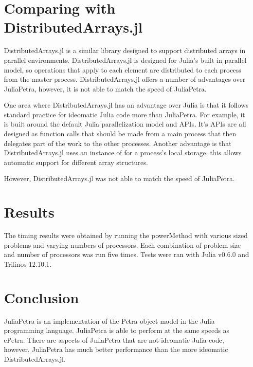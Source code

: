 \documentclass{article}
\newcommand{\juliaSnippet}[1]{\texttt{\detokenize{#1}}}
\begin{document}
\section{Comparing with DistributedArrays.jl}

DistributedArrays.jl is a similar library designed to support distributed arrays in parallel environments.
\cite{DAGithub}
DistributedArrays.jl is designed for Julia's built in parallel model, so operations that apply to
each element are distributed to each process from the master process.  DistributedArrays.jl offers a number of advantages over JuliaPetra, however, it is not able to
match the speed of JuliaPetra.

One area where DistributedArrays.jl has an advantage over Julia is that it follows standard
practice for ideomatic Julia code more than JuliaPetra.
For example, it is built around the default Julia parallelization model and APIs.
It's APIs are all designed as function calls that should be made from a main process that
then delegates part of the work to the other processes. %
Another advantage is that DistributedArrays.jl uses an instance of \juliaSnippet{AbstractArray}
for a process's local storage, this allows automatic support for different array structures.

However, DistributedArrays.jl was not able to match the speed of JuliaPetra.

\section{Results}


The timing results were obtained by running the powerMethod with various sized problems and varying
numbers of processors.  Each combination of problem size and number of processors was run five times.
Tests were ran with Julia v0.6.0 and Trilinos 12.10.1.


\section{Conclusion}

JuliaPetra is an implementation of the Petra object model in the Julia programming language.
JuliaPetra is able to perform at the same speeds as ePetra.
There are aspects of JuliaPetra that are not ideomatic Julia code, however, JuliaPetra has much
better performance than the more ideomatic DistributedArrays.jl.





\end{document}
